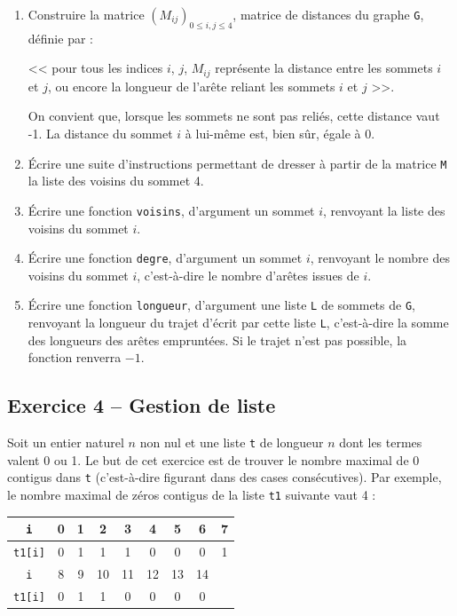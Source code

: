 \documentclass[10pt,fleqn]{article} %
\begin{document}
\begin{multicols}{2}
\begin{enumerate}
\item Construire la matrice $\left( M_{ij}\right)_{0\leq i,j\leq 4}$, matrice de distances du graphe \texttt{G}, définie par :

<< pour tous les indices $i$, $j$, $M_{ij}$ représente la distance entre les sommets $i$ et $j$,
ou encore la longueur de l'arête reliant les sommets $i$ et $j$ >>.

On convient que, lorsque les sommets ne sont pas reliés, cette distance vaut -1. La distance du
sommet $i$ à lui-même est, bien sûr, égale à 0.
\item Écrire une suite d'instructions permettant de dresser à partir de la matrice \texttt{M} la liste des voisins du sommet 4.
\item Écrire une fonction \texttt{voisins}, d'argument un sommet $i$, renvoyant la liste des voisins du sommet $i$.
\item Écrire une fonction \texttt{degre}, d'argument un sommet $i$, renvoyant le nombre des voisins du sommet $i$, c'est-à-dire le nombre d’arêtes issues de $i$.
\item Écrire une fonction \texttt{longueur}, d’argument une liste \texttt{L} de sommets de \texttt{G}, renvoyant la longueur du trajet d'écrit par cette liste \texttt{L}, c’est-à-dire la somme des longueurs des arêtes empruntées. Si le trajet n'est pas possible, la fonction renverra $-1$.
\end{enumerate}


\subsection*{Exercice 4 -- Gestion de liste}
Soit un entier naturel $n$ non nul et une liste \texttt{t} de longueur $n$ dont les termes valent 0 ou 1. Le but de cet exercice est de trouver le nombre maximal de 0 contigus dans \texttt{t} (c’est-à-dire figurant dans des cases consécutives). Par exemple, le nombre maximal de zéros contigus de la liste \texttt{t1} suivante vaut 4 :
\begin{center}
\begin{tabular}{|c|c|c|c|c|c|c|c|c|}
\hline 
\texttt{i} & 0 & 1 & 2 & 3 & 4 & 5 & 6 & 7 \\
\hline
\texttt{t1[i]} & 0 & 1 & 1 & 1 & 0 & 0 & 0 & 1 \\
\hline
\hline
\texttt{i} & 8 & 9 & 10 & 11 & 12 & 13 & 14 \\
\cline{0-7} 
\texttt{t1[i]} & 0 & 1 & 1 & 0 & 0 & 0 & 0 \\
\cline{0-7}  
\end{tabular}
\end{center}


\end{multicols}
\end{document}
